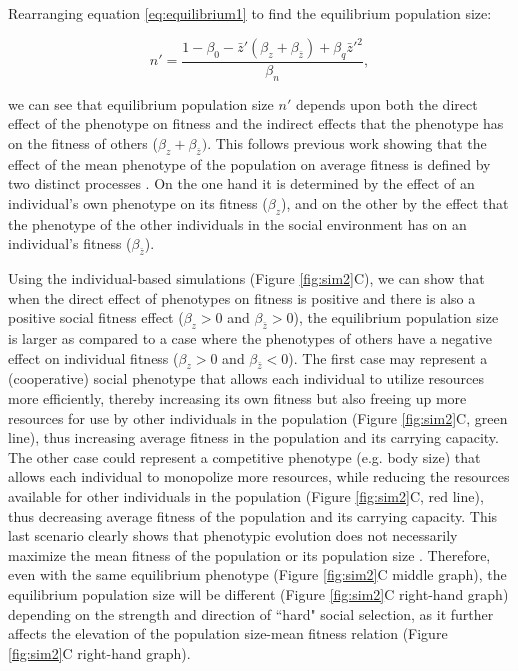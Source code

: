 \documentclass{article}
\begin{document}
\noindent Rearranging equation \ref{eq:equilibrium1} to find the equilibrium population size:
 
\begin{equation}
n' = \frac{1-\beta_{0} - \bar{z}'(\beta_{z} + \beta_{\bar{z}} )+  \beta_{q} \bar{z}'^2}{\beta_{n}},
\end{equation}

\noindent we can see that equilibrium population size $n'$ depends upon both the direct effect of the phenotype on fitness and the indirect effects that the phenotype has on the fitness of others ($\beta_{z} + \beta_{\bar{z}})$. This follows previous work showing that the effect of the mean phenotype of the population on average fitness is defined by two distinct processes \citep{Engen2020, Lande2007, Abrams1993}. On the one hand it is determined by the effect of an individual's own phenotype on its fitness ($\beta_{z}$), and on the other by the effect that the phenotype of the other individuals in the social environment has on an individual's fitness ($\beta_{\bar{z}}$).

Using the individual-based simulations (Figure \ref{fig:sim2}C), we can show that when the direct effect of phenotypes on fitness is positive and there is also a positive social fitness effect ($\beta_{z}>0$ and $\beta_{\bar{z}}>0$), the equilibrium population size is larger as compared to a case where the phenotypes of others have a negative effect on individual fitness ($\beta_{z}>0$ and $\beta_{\bar{z}}<0$). The first case may represent a (cooperative) social phenotype that allows each individual to utilize resources more efficiently, thereby increasing its own fitness but also freeing up more resources for use by other individuals in the population (Figure \ref{fig:sim2}C, green line), thus increasing average fitness in the population and its carrying capacity. The other case could represent a competitive phenotype (e.g. body size) that allows each individual to monopolize more resources, while reducing the resources available for other individuals in the population (Figure \ref{fig:sim2}C, red line), thus decreasing average fitness of the population and its carrying capacity. This last scenario clearly shows that phenotypic evolution does not necessarily maximize the mean fitness of the population or its population size \citep{Wright1969, Abrams1993}. Therefore, even with the same equilibrium phenotype (Figure \ref{fig:sim2}C middle graph), the equilibrium population size will be different (Figure \ref{fig:sim2}C right-hand graph) depending on the strength and direction of ``hard" social selection, as it further affects the elevation of the population size-mean fitness relation (Figure \ref{fig:sim2}C right-hand graph).
\end{document}
